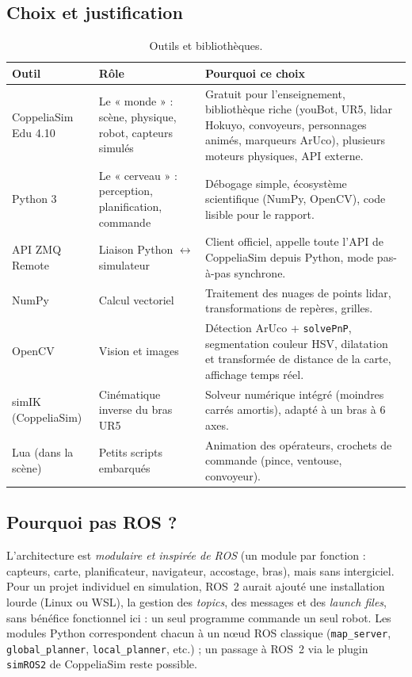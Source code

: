 \documentclass[11pt,a4paper]{article}
\newcommand{\code}[1]{\texttt{#1}}
\begin{document}
\subsection{Choix et justification}
\begin{table}[h]
\centering\small
\begin{tabularx}{\linewidth}{@{}lp{3.2cm}L@{}}
\toprule
\textbf{Outil} & \textbf{Rôle} & \textbf{Pourquoi ce choix} \\
\midrule
CoppeliaSim Edu 4.10 & Le « monde » : scène, physique, robot, capteurs simulés &
  Gratuit pour l'enseignement, bibliothèque riche (youBot, UR5, lidar Hokuyo, convoyeurs, personnages
  animés, marqueurs ArUco), plusieurs moteurs physiques, API externe. \\
Python 3 & Le « cerveau » : perception, planification, commande &
  Débogage simple, écosystème scientifique (NumPy, OpenCV), code lisible pour le rapport. \\
API ZMQ Remote & Liaison Python $\leftrightarrow$ simulateur &
  Client officiel, appelle toute l'API de CoppeliaSim depuis Python, mode pas-à-pas synchrone. \\
NumPy & Calcul vectoriel &
  Traitement des nuages de points lidar, transformations de repères, grilles. \\
OpenCV & Vision et images &
  Détection ArUco + \code{solvePnP}, segmentation couleur HSV, dilatation et transformée de
  distance de la carte, affichage temps réel. \\
simIK (CoppeliaSim) & Cinématique inverse du bras UR5 &
  Solveur numérique intégré (moindres carrés amortis), adapté à un bras à 6 axes. \\
Lua (dans la scène) & Petits scripts embarqués &
  Animation des opérateurs, crochets de commande (pince, ventouse, convoyeur). \\
\bottomrule
\end{tabularx}
\caption{Outils et bibliothèques.}
\end{table}

\subsection{Pourquoi pas ROS ?}
L'architecture est \emph{modulaire et inspirée de ROS} (un module par fonction : capteurs, carte,
planificateur, navigateur, accostage, bras), mais sans intergiciel. Pour un projet individuel en
simulation, ROS~2 aurait ajouté une installation lourde (Linux ou WSL), la gestion des
\emph{topics}, des messages et des \emph{launch files}, sans bénéfice fonctionnel ici : un seul
programme commande un seul robot. Les modules Python correspondent chacun à un nœud ROS classique
(\code{map\_server}, \code{global\_planner}, \code{local\_planner}, etc.) ; un passage à ROS~2 via
le plugin \code{simROS2} de CoppeliaSim reste possible.
\end{document}
